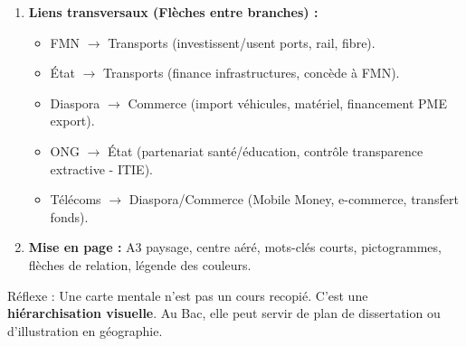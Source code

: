 \documentclass[11pt]{article}
\newcommand{\cle}[1]{{\popxbold\color{popdark}#1}}
\begin{document}
\begin{methode}
\begin{enumerate}
\begin{enumerate}
        \item \textbf{🟥 Commerce International} : Accords (OMC, APE UE-CEMAC, ZLECAf, AGOA), Structure (Export primaires 80\%+, Import machines/produits finis), Partenaires (UE 40\%, Chine 25\%, CEMAC 10\%), Déficit chronique, Enjeu transformation locale (2ème/3ème transformation bois, cacao, coton).
    \end{enumerate}
    \item \textbf{Liens transversaux (Flèches entre branches) :}
    \begin{itemize}
        \item FMN $\rightarrow$ Transports (investissent/usent ports, rail, fibre).
        \item État $\rightarrow$ Transports (finance infrastructures, concède à FMN).
        \item Diaspora $\rightarrow$ Commerce (import véhicules, matériel, financement PME export).
        \item ONG $\rightarrow$ État (partenariat santé/éducation, contrôle transparence extractive - ITIE).
        \item Télécoms $\rightarrow$ Diaspora/Commerce (Mobile Money, e-commerce, transfert fonds).
    \end{itemize}
    \item \textbf{Mise en page :} A3 paysage, centre aéré, mots-clés courts, pictogrammes, flèches de relation, légende des couleurs.
\end{enumerate}
\cle{Réflexe} : Une carte mentale n'est pas un cours recopié. C'est une \textbf{hiérarchisation visuelle}. Au Bac, elle peut servir de plan de dissertation ou d'illustration en géographie.
\end{methode}
\end{document}
